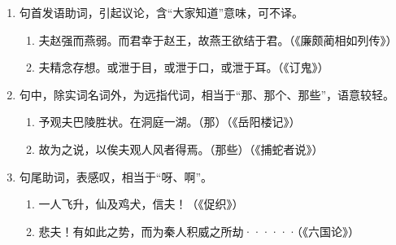 \noindent
[\ 夫\ ]
\begin{enumerate}[label=(\arabic*)]
	\item 句首发语助词，引起议论，含“大家知道”意味，可不译。
	\begin{enumerate}[label=\textcircled{\arabic*}]
		\item 夫赵强而燕弱。而君幸于赵王，故燕王欲结于君。（《廉颇蔺相如列传》）
		\item 夫精念存想。或泄于目，或泄于口，或泄于耳。（《订鬼》）
	\end{enumerate}
	\item 句中，除实词名词外，为远指代词，相当于“那、那个、那些”，语意较轻。
	\begin{enumerate}[label=\textcircled{\arabic*}]
		\item 予观夫巴陵胜状。在洞庭一湖。（那）（《岳阳楼记》）
		\item 故为之说，以俟夫观人风者得焉。（那些）（《捕蛇者说》）
	\end{enumerate}
	\item 句尾助词，表感叹，相当于“呀、啊”。
	\begin{enumerate}[label=\textcircled{\arabic*}]
		\item 一人飞升，仙及鸡犬，信夫！（《促织》）
		\item 悲夫！有如此之势，而为秦人积威之所劫······（《六国论》）
	\end{enumerate}
\end{enumerate}

